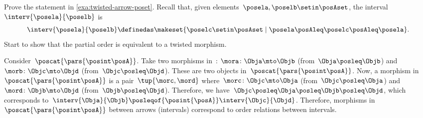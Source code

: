 \begin{exercise}
    Prove the statement in \cref{exa:twisted-arrow-poset}.
    Recall that, given elements~$\posela, \poselb \setin \posAset$, the interval~$\interv{\posela}{\poselb}$ is
    \begin{equation}
        \interv{\posela}{\poselb}
        \definedas \makeset{\poselc \setin \posAset \mid \posela\posAleq \poselc \posAleq \posela}.
    \end{equation}
    Start to show that the partial order is equivalent to a twisted morphism.
\end{exercise}
\begin{solution}
    Consider~$\poscat{\pars{\posint\posA}}$.
    Take two morphisms in~\posA: $\mora\colon \Obja \mto \Objb$ (from~$\Obja \posleq \Objb$) and $\morb\colon \Objc\mto \Objd$ (from~$\Objc \posleq \Objd$).
    These are two objects in~$\poscat{\pars{\posint\posA}}$.
    Now, a morphism in~$\poscat{\pars{\posint\posA}}$ is a pair~$\tup{\morc,\mord}$ where~$\morc\colon \Objc \mto \Obja$ (from~$\Objc\posleq \Obja$) and~$\mord\colon \Objb \mto \Objd$ (from~$\Objb\posleq \Objd$).
    Therefore, we have~$\Objc\posleq \Obja\posleq \Objb\posleq \Objd$, which corresponds to~$\interv{\Obja}{\Objb}\posleqof{\posint{\posA}}\interv{\Objc}{\Objd}$.
    Therefore, morphisms in~$\poscat{\pars{\posint\posA}}$ between arrows (intervals) correspond to order relations between intervals.
\end{solution}

